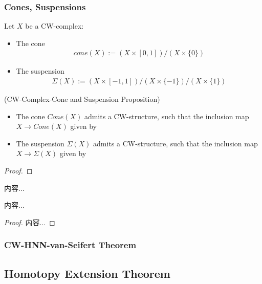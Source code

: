 \documentclass[Total.tex]{subfiles}
\begin{document}
	\subsubsection{Cones, Suspensions}
	\begin{Def}
		Let $X$ be a CW-complex:
		\begin{itemize}
			\item The cone
			\begin{gather*}
				cone(X):=(X\times [0,1])/(X\times \{0\})
			\end{gather*}
			\item The suspension
			\begin{gather*}
				\Sigma(X):=(X\times [-1,1])/(X\times \{-1\})/(X\times \{1\})
			\end{gather*}
		\end{itemize}
	\end{Def}
	\begin{proposition}
		(CW-Complex-Cone and Suspension Proposition)
		\begin{itemize}
			\item The cone $Cone(X)$ admits a CW-structure, such that the inclusion map $X\rightarrow Cone(X)$ given by
			\item The suspension $\Sigma(X)$ admits a CW-structure, such that the inclusion map $X\rightarrow \Sigma(X)$ given by
		\end{itemize}
	\end{proposition}
	\begin{proof}
		
	\end{proof}
	\begin{Def}
		内容...
	\end{Def}
	\begin{proposition}
		内容...
	\end{proposition}
	\begin{proof}
		内容...
	\end{proof}
	\subsubsection{CW-HNN-van-Seifert Theorem}
	\subsection{Homotopy Extension Theorem}
\end{document}
